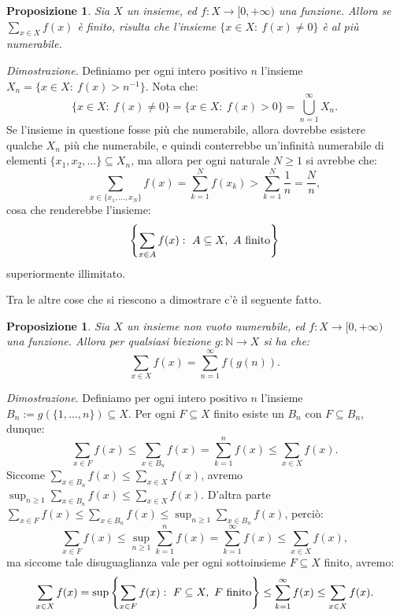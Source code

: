 \documentclass[11pt]{book}
\makeatletter
\theoremstyle{Definizione}
\theoremstyle{TeoremaProposizioneLemmaCorollario}
\newtheorem{mypropo}[myteo]{Proposizione}
\theoremstyle{OsservazioneNota}
\renewenvironment{proof}[1][\proofname]{\par
  \normalfont \topsep6\p@\@plus6\p@\relax
  \trivlist
  \item[\hskip\labelsep
        \itshape
    #1\@addpunct{.}]\ignorespaces
}{%
  \endtrivlist\@endpefalse
}
\newcommand{\N}{\mathbb{N}}
\renewenvironment{proof}{\textsl{Dimostrazione}.}{}
\makeatother
\begin{document}
\begin{boxpro}\label{pro:SommeGeneralizzateSommaFinita}
\begin{mypropo}
Sia $X$ un insieme, ed $f:X \longrightarrow [0,+\infty)$ una funzione. Allora se $\sum_{x\in X} f(x)$ è finito, risulta che l'insieme $\{x\in X:\ f(x) \neq 0\}$ è al più numerabile.
\end{mypropo}
\tcblower
\begin{proof}
Definiamo per ogni intero positivo $n$ l'insieme $X_n = \{x\in X:\ f(x) > n^{-1}\}$. Nota che:
$$
\{x\in X:\ f(x) \neq 0\} = \{x\in X:\ f(x) > 0\} = \bigcup_{n = 1}^\infty X_n.
$$
Se l'insieme in questione fosse più che numerabile, allora dovrebbe esistere qualche $X_n$ più che numerabile, e quindi conterrebbe un'infinità numerabile di elementi $\{x_1,x_2,\dots\}\subseteq X_n$, ma allora per ogni naturale $N \geq 1$ si avrebbe che:
$$
\sum_{x\in \{x_1,\dots,x_N\}} f(x) = \sum_{k = 1}^N f(x_k) > \sum_{k = 1}^N \frac{1}{n} = \frac{N}{n},
$$
cosa che renderebbe l'insieme:
$$
\left\{\sum_{x\in A} f(x) :\ A\subseteq X,\ A\textup{ finito}\right\}
$$
superiormente illimitato.
\end{proof}
\end{boxpro}
\noindent
Tra le altre cose che si riescono a dimostrare c'è il seguente fatto.
\begin{boxpro}
\begin{mypropo}\label{pro:SommeGeneralizzateIndipendenzaOrdinamento}
Sia $X$ un insieme non vuoto numerabile, ed $f:X\longrightarrow [0,+\infty)$ una funzione. Allora per qualsiasi biezione $g:\N \longrightarrow X$ si ha che:
$$
\sum_{x\in X} f(x) = \sum_{n = 1}^\infty f(g(n)).
$$
\end{mypropo}
\tcblower
\begin{proof}
Definiamo per ogni intero positivo $n$ l'insieme $B_n:= g(\{1,\dots,n\})\subseteq X$. Per ogni $F\subseteq X$ finito esiste un $B_n$ con $F \subseteq B_n$, dunque:
$$
\sum_{x\in F} f(x) \leq \sum_{x\in B_n} f(x) = \sum_{k = 1}^n f(x) \leq \sum_{x\in X} f(x).
$$
Siccome $\sum_{x\in B_n} f(x) \leq \sum_{x\in X} f(x)$, avremo $\sup_{n \geq 1} \sum_{x\in B_n} f(x) \leq \sum_{x\in X} f(x)$. D'altra parte $\sum_{x\in F} f(x) \leq \sum_{x\in B_n} f(x) \leq \sup_{n \geq 1} \sum_{x\in B_n} f(x)$, perciò:
$$
\sum_{x\in F} f(x) \leq \sup_{n \geq 1} \sum_{k = 1}^n f(x) = \sum_{k = 1}^\infty f(x) \leq \sum_{x\in X} f(x),
$$
ma siccome tale disuguaglianza vale per ogni sottoinsieme $F\subseteq X$ finito, avremo:
$$
\sum_{x\in X} f(x) = \sup\left\{\sum_{x\in F} f(x):\ F\subseteq X,\ F\textup{ finito}\right\}\leq \sum_{k = 1}^\infty f(x) \leq \sum_{x\in X} f(x).
$$
\end{proof}
\end{boxpro}
\end{document}
